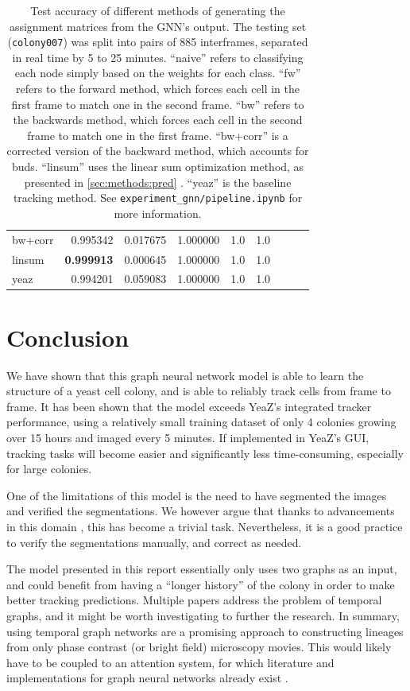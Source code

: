 \documentclass[10pt,conference,compsocconf,a4paper]{IEEEtran}
\newcommand*{\shortautoref}[1]{%
	\begingroup
	\def\equationautorefname{\textsc{Eq.}}%
	\def\tableautorefname{\textsc{Tab.}}%
	\def\figureautorefname{\textsc{Fig.}}%
	\autoref{#1}%
	\endgroup
}
\begin{document}
\begin{table}
\begin{tabular}{lrrrrrrrr}
			bw+corr       &  0.995342 &  0.017675 &  1.000000 &  1.0 &  1.0 \\
			linsum        &  \textbf{0.999913} &  0.000645 &  1.000000 &  1.0 &  1.0 \\
			\midrule
			yeaz          &  0.994201 &  0.059083 &  1.000000 &  1.0 &  1.0 \\
			\bottomrule
			\end{tabular}
			\caption{Test accuracy of different methods of generating the assignment matrices from the GNN's output. The testing set (\texttt{colony007}) was split into pairs of 885 interframes, separated in real time by 5 to 25 minutes. ``naive'' refers to classifying each node simply based on the weights for each class. ``fw'' refers to the forward method, which forces each cell in the first frame to match one in the second frame. ``bw'' refers to the backwards method, which forces each cell in the second frame to match one in the first frame. ``bw+corr'' is a corrected version of the backward method, which accounts for buds. ``linsum'' uses the linear sum optimization method, as presented in \shortautoref{sec:methods:pred}. ``yeaz'' is the baseline tracking method. See \texttt{experiment\_gnn/pipeline.ipynb} for more information.}
			\label{tab:test_acc}
		\end{table}


\section{Conclusion}

	We have shown that this graph neural network model is able to learn the structure of a yeast cell colony, and is able to reliably track cells from frame to frame. It has been shown that the model exceeds YeaZ's integrated tracker performance, using a relatively small training dataset of only 4 colonies growing over 15 hours and imaged every 5 minutes. If implemented in YeaZ's GUI, tracking tasks will become easier and significantly less time-consuming, especially for large colonies.

	One of the limitations of this model is the need to have segmented the images and verified the segmentations. We however argue that thanks to advancements in this domain \cite{dietler_convolutional_2020,stringer_cellpose_2020}, this has become a trivial task. Nevertheless, it is a good practice to verify the segmentations manually, and correct as needed.

	The model presented in this report essentially only uses two graphs as an input, and could benefit from having a ``longer history'' of the colony in order to make better tracking predictions. Multiple papers \cite{singer_node_2019,jin_recurrent_2020,rossi_temporal_2020} address the problem of temporal graphs, and it might be worth investigating to further the research. In summary, using temporal graph networks are a promising approach to constructing lineages from only phase contrast (or bright field) microscopy movies. This would likely have to be coupled to an attention system, for which literature and implementations for graph neural networks already exist \cite{velickovic_graph_2018,brody_how_2021}.
\end{document}
